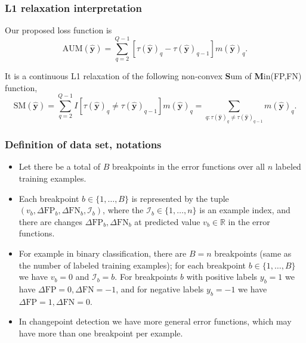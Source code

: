 \documentclass{beamer}
\begin{document}
\begin{frame}
  \frametitle{L1 relaxation interpretation}
  
Our proposed loss function is
\begin{equation*}
\label{eq:AUM-computation}
    \text{AUM}(\mathbf {\hat y}) =
    \sum_{q=2}^{Q-1}
    [ \tau(\mathbf {\hat y})_{q} - \tau(\mathbf {\hat y})_{q-1} ]
    m(\mathbf {\hat y})_q.
\end{equation*}

It is a continuous L1 relaxation of the following non-convex \textbf{S}um of \textbf{M}in(FP,FN) function, 
\begin{equation*}
\label{eq:SM-computation}
    \text{SM}(\mathbf {\hat y}) =
    \sum_{q=2}^{Q-1}
    I[ \tau(\mathbf {\hat y})_{q} \neq \tau(\mathbf {\hat y})_{q-1} ]
    m(\mathbf {\hat y})_q =
    \sum_{q:\tau(\mathbf {\hat y})_{q} \neq \tau(\mathbf {\hat y})_{q-1} }
    m(\mathbf {\hat y})_q.
\end{equation*}

\end{frame}

\begin{frame}
  \frametitle{Definition of data set, notations}

  \begin{itemize}
  \item Let there be a total of $B$ breakpoints in the error functions over
    all $n$ labeled training examples.
  \item Each breakpoint
  $b\in\{1,\dots, B\}$ is represented by the tuple
  $(v_b, \Delta\text{FP}_b, \Delta\text{FN}_b, \mathcal I_b)$, where the
  $\mathcal I_b\in\{1,\dots,n\}$ is an example index, and there are
  changes $\Delta\text{FP}_b, \Delta\text{FN}_b$ at predicted value
  $v_b\in\mathbb R$ in the error functions.
\item For example in binary
  classification, there are $B=n$ breakpoints (same as the number of
  labeled training examples); for each breakpoint $b\in\{1,\dots,B\}$
  we have $v_b=0$ and $\mathcal I_b=b$.  For breakpoints $b$ with
  positive labels $y_b=1$ we have
  $\Delta\text{FP}=0,\Delta\text{FN}=-1$, and for negative labels
  $y_b=-1$ we have $\Delta\text{FP}=1,\Delta\text{FN}=0$.  
\item   In
  changepoint detection we have more general error functions, which
  may have more than one breakpoint per example.
  \end{itemize}
  
\end{frame}
\end{document}
